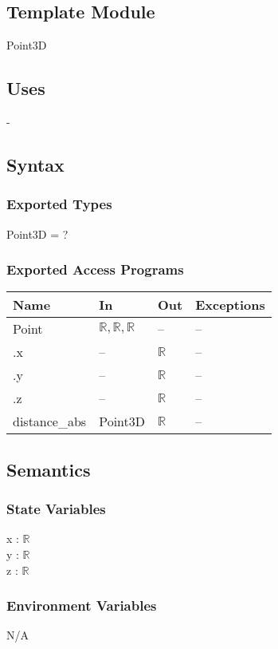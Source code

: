 \documentclass[12pt, titlepage]{article}
\begin{document}
\subsection{Template Module}
Point3D

\subsection{Uses} -

\subsection{Syntax}
\subsubsection{Exported Types}
Point3D = ?

\subsubsection{Exported Access Programs}
\begin{center}
	\begin{tabular}{p{4cm} p{2cm} p{2cm} p{4cm}}
		\hline
		\textbf{Name} & \textbf{In} & \textbf{Out} & \textbf{Exceptions} \\
		\hline
		Point & $\mathbb{R}, \mathbb{R}, \mathbb{R}$ & -- & -- \\
		.x & -- & $\mathbb{R}$ & -- \\
		.y & -- & $\mathbb{R}$ & -- \\		
		.z & -- & $\mathbb{R}$ & -- \\
		distance\_abs & Point3D & $\mathbb{R}$ & -- \\
		\hline
	\end{tabular}
\end{center}

\subsection{Semantics}
\subsubsection{State Variables}
x : $\mathbb{R}$ \\
y : $\mathbb{R}$ \\
z : $\mathbb{R}$ \\

\subsubsection{Environment Variables}
N/A
\end{document}
